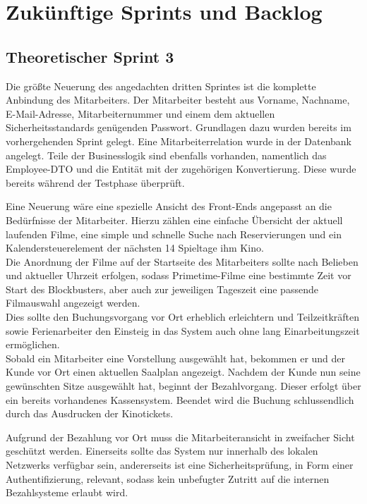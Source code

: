 \section{Zukünftige Sprints und Backlog}

\subsection{Theoretischer Sprint 3}
\label{ssec:theoretischer_sprint}
\multipleauthorsection{\authorRF}{\authorEJ}
Die größte Neuerung des angedachten dritten Sprintes ist die komplette Anbindung des Mitarbeiters.
Der Mitarbeiter besteht aus Vorname, Nachname, E-Mail-Adresse, Mitarbeiternummer und einem dem aktuellen Sicherheitsstandards genügenden Passwort.
Grundlagen dazu wurden bereits im vorhergehenden Sprint gelegt.
Eine Mitarbeiterrelation wurde in der Datenbank angelegt.
Teile der Businesslogik sind ebenfalls vorhanden, namentlich das Employee-\acs{DTO} und die Entität mit der zugehörigen Konvertierung.
Diese wurde bereits während der Testphase überprüft.

Eine Neuerung wäre eine spezielle Ansicht des Front-Ends angepasst an die Bedürfnisse der Mitarbeiter.
Hierzu zählen eine einfache Übersicht der aktuell laufenden Filme, eine simple und schnelle Suche nach Reservierungen und ein Kalendersteuerelement der nächsten 14 Spieltage ihm Kino. \\
Die Anordnung der Filme auf der Startseite des Mitarbeiters sollte nach Belieben und aktueller Uhrzeit erfolgen, sodass Primetime-Filme eine bestimmte Zeit vor Start des Blockbusters, aber auch zur jeweiligen Tageszeit eine passende Filmauswahl angezeigt werden. \\
Dies sollte den Buchungsvorgang vor Ort erheblich erleichtern und Teilzeitkräften sowie Ferienarbeiter den Einsteig in das System auch ohne lang Einarbeitungszeit ermöglichen. \\

Sobald ein Mitarbeiter eine Vorstellung ausgewählt hat, bekommen er und der Kunde vor Ort einen aktuellen Saalplan angezeigt.
Nachdem der Kunde nun seine gewünschten Sitze ausgewählt hat, beginnt der Bezahlvorgang.
Dieser erfolgt über ein bereits vorhandenes Kassensystem. Beendet wird die Buchung schlussendlich durch das Ausdrucken der Kinotickets. 

Aufgrund der Bezahlung vor Ort muss die Mitarbeiteransicht in zweifacher Sicht geschützt werden.
Einerseits sollte das System nur innerhalb des lokalen Netzwerks verfügbar sein, andererseits ist eine Sicherheitsprüfung, in Form einer Authentifizierung, relevant, sodass kein unbefugter Zutritt auf die internen Bezahlsysteme erlaubt wird.

